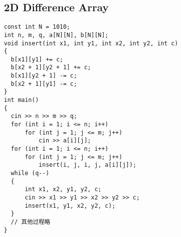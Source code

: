 \subsection{2D Difference Array}
\begin{lstlisting}
const int N = 1010;
int n, m, q, a[N][N], b[N][N];
void insert(int x1, int y1, int x2, int y2, int c)
{
  b[x1][y1] += c;
  b[x2 + 1][y2 + 1] += c;
  b[x1][y2 + 1] -= c;
  b[x2 + 1][y1] -= c;
}
int main()
{
  cin >> n >> m >> q;
  for (int i = 1; i <= n; i++)
      for (int j = 1; j <= m; j++)
          cin >> a[i][j];
  for (int i = 1; i <= n; i++)
      for (int j = 1; j <= m; j++)
          insert(i, j, i, j, a[i][j]);
  while (q--)
  {
      int x1, x2, y1, y2, c;
      cin >> x1 >> y1 >> x2 >> y2 >> c;
      insert(x1, y1, x2, y2, c);
  }
  // 其他过程略
}
\end{lstlisting}
